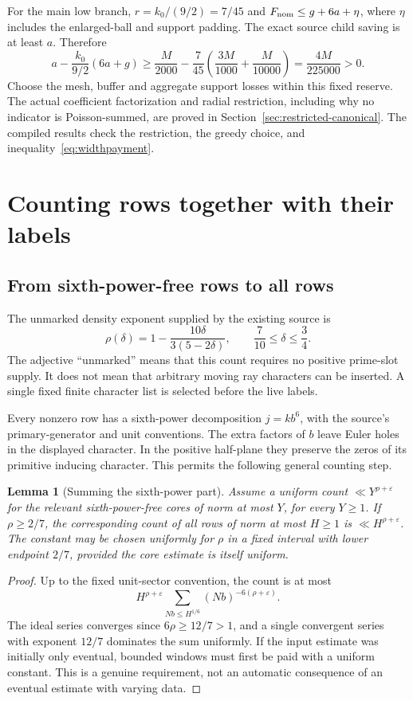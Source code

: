 \documentclass[11pt]{article}
\newtheorem{lemma}[proposition]{Lemma}
\theoremstyle{definition}
\newcommand{\eps}{\varepsilon}
\begin{document}
For the main low branch, $r=k_0/(9/2)=7/45$ and
$F_{\rm nom}\le g+6a+\eta$, where $\eta$ includes the enlarged-ball and
support padding. The exact source child saving is at least $a$. Therefore
\begin{equation}\label{eq:lowreserve}
 a-\frac{k_0}{9/2}(6a+g)
 \ge\frac M{2000}-\frac7{45}
       \left(\frac{3M}{1000}+\frac M{10000}\right)
 =\frac{4M}{225000}>0.
\end{equation}
Choose the mesh, buffer and aggregate support losses within this fixed
reserve. The actual coefficient factorization and radial restriction,
including why no indicator is Poisson-summed, are proved in
Section~\ref{sec:restricted-canonical}. The compiled results check the
restriction, the greedy choice, and inequality~\eqref{eq:widthpayment}.

\section{Counting rows together with their labels}\label{sec:high}

\subsection{From sixth-power-free rows to all rows}
The unmarked density exponent supplied by the existing source is
\begin{equation}\label{eq:rho}
 \rho(\delta)=1-\frac{10\delta}{3(5-2\delta)},
 \qquad \frac7{10}\le\delta\le\frac34.
\end{equation}
The adjective ``unmarked'' means that this count requires no positive
prime-slot supply. It does not mean that arbitrary moving ray characters
can be inserted. A single fixed finite character list is selected before
the live labels.

Every nonzero row has a sixth-power decomposition $j=kb^6$, with the
source's primary-generator and unit conventions. The extra factors of
$b$ leave Euler holes in the displayed character. In the positive
half-plane they preserve the zeros of its primitive inducing character.
This permits the following general counting step.

\begin{lemma}[Summing the sixth-power part]\label{lem:sixth}
Assume a uniform count $\ll Y^{\rho+\eps}$ for the relevant
sixth-power-free cores of norm at most $Y$, for every $Y\ge1$.
If $\rho\ge2/7$, the corresponding count of all rows of norm at most
$H\ge1$ is $\ll H^{\rho+\eps}$. The constant may be chosen uniformly
for $\rho$ in a fixed interval with lower endpoint $2/7$, provided the
core estimate is itself uniform.
\end{lemma}
\begin{proof}
Up to the fixed unit-sector convention, the count is at most
\[
 H^{\rho+\eps}\sum_{Nb\le H^{1/6}}(Nb)^{-6(\rho+\eps)}.
\]
The ideal series converges since $6\rho\ge12/7>1$, and a single
convergent series with exponent $12/7$ dominates the sum uniformly.
If the input estimate was initially only eventual, bounded windows must
first be paid with a uniform constant. This is a genuine requirement,
not an automatic consequence of an eventual estimate with varying data.
\end{proof}
\end{document}

